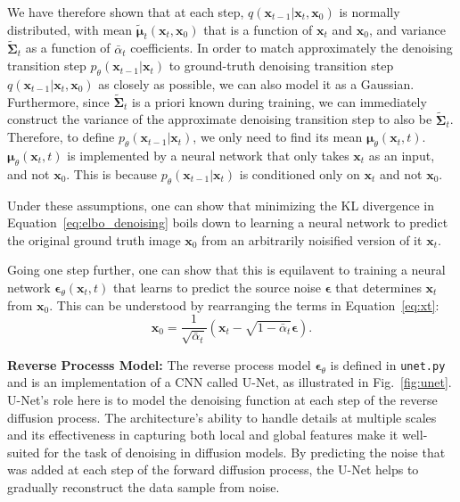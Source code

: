 \documentclass[11pt,addpoints,answers]{exam}
\newcommand{\xv}{\mathbf{x}}
\newcommand{\epsilonv   }{\boldsymbol \epsilon   }
\newcommand{\muv        }{\boldsymbol \mu        }
\begin{document}
\begin{questions}
    We have therefore shown that at each step, 
 $q(\xv_{t-1} | \xv_t, \xv_0)$ is normally distributed, with mean $\tilde{\muv}_t(\xv_t, \xv_0)$
 that is a function of $\xv_t$ and $\xv_0$, and variance $\tilde{\boldsymbol{\Sigma}}_t$ as a function of $\bar\alpha_{t}$ coefficients. In order to match approximately the denoising transition step $p_\theta(\xv_{t-1}|\xv_t)$
 to ground-truth denoising transition step $q(\xv_{t-1} | \xv_t, \xv_0)$
 as closely as possible, we can also model it as a Gaussian. Furthermore, since $\tilde{\boldsymbol{\Sigma}}_t$ is a priori known during training, we can immediately construct the variance of the approximate denoising transition step to also be 
$\tilde{\boldsymbol{\Sigma}}_t$. Therefore, to define $p_\theta(\xv_{t-1}|\xv_t)$, we only need to find its mean $\boldsymbol{\mu}_\theta(\xv_t, t)$. $\boldsymbol{\mu}_\theta(\xv_t, t)$ is implemented by a neural network that only takes $\xv_t$ as an input, and not $\xv_0$. This is because $p_\theta(\xv_{t-1}|\xv_t)$ is conditioned only on $\xv_t$ and not $\xv_0$.
    \par
Under these assumptions, one can show that minimizing the KL divergence in Equation~\ref{eq:elbo_denoising} boils down to learning a neural network to predict the original ground truth image $\xv_0$ from an arbitrarily noisified version of it $\xv_t$. 

Going one step further, one can show that this is equilavent to training a neural network $\boldsymbol{\epsilon}_\theta(\xv_t,t)$ that learns to predict the source noise $\boldsymbol{\epsilon}$
 that determines $\xv_t$
 from $\xv_0$. This can be understood by rearranging the terms in Equation~\ref{eq:xt}: 
\begin{equation}
        \xv_0 = \frac{1}{\sqrt{\bar{\alpha}_t}} \left( \xv_t - \sqrt{1 - \bar{\alpha}_t} \epsilonv \right).
\end{equation}

    \textbf{Reverse Processs Model:} The reverse process model $\boldsymbol{\epsilon}_\theta$ is defined in \lstinline{unet.py} and is an implementation of a CNN called U-Net, as illustrated in Fig.~\ref{fig:unet}. 
    U-Net's role here is to model the denoising function at each step of the reverse diffusion process. The architecture's ability to handle details at multiple scales and its effectiveness in capturing both local and global features make it well-suited for the task of denoising in diffusion models. By predicting the noise that was added at each step of the forward diffusion process, the U-Net helps to gradually reconstruct the data sample from noise.
    

\end{questions}
\end{document}
